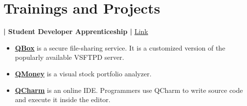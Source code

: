 \documentclass[]{deedy-resume-openfont}
\begin{document}
\begin{minipage}[t]{0.66\textwidth}

\section{Trainings and Projects}

\textbf{| Student Developer Apprenticeship | }\href{https://criodo.github.io/Crio-Launch-Feb-2020-anugrahsinghal1}{Link}\\
\begin{itemize}
\item \href{https://criodo.github.io/Crio-Launch-Feb-2020-anugrahsinghal1/detail/ME_QBOX}{\underline{\textbf{QBox}}} is a secure file-sharing service. It is a customized version of the popularly available VSFTPD server.
\item \href{https://criodo.github.io/Crio-Launch-Feb-2020-anugrahsinghal1/detail/ME_QMONEY}{\underline{\textbf{QMoney}}} is a visual stock portfolio analyzer.
\item \href{https://criodo.github.io/Crio-Launch-Feb-2020-anugrahsinghal1/detail/ME_QCHARM}{\underline{\textbf{QCharm}}} is an online IDE. Programmers use QCharm to write source code and execute it inside the editor.
\end{itemize}
\sectionsep


\end{minipage}
\end{document}
